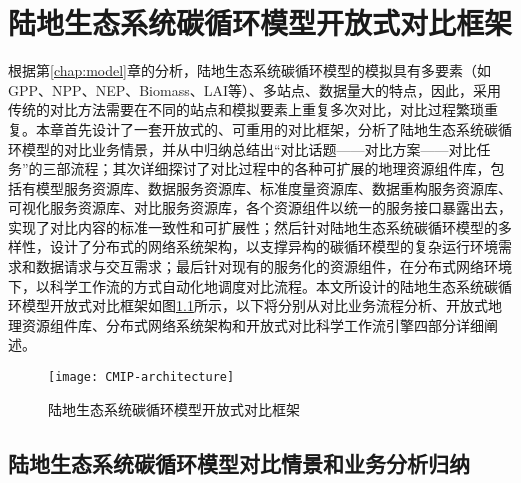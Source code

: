 \chapter{陆地生态系统碳循环模型开放式对比框架}

根据第\ref{chap:model}章的分析，陆地生态系统碳循环模型的模拟具有多要素（如GPP、NPP、NEP、Biomass、LAI等）、多站点、数据量大的特点，因此，采用传统的对比方法需要在不同的站点和模拟要素上重复多次对比，对比过程繁琐重复。本章首先设计了一套开放式的、可重用的对比框架，分析了陆地生态系统碳循环模型的对比业务情景，并从中归纳总结出“对比话题——对比方案——对比任务”的三部流程；其次详细探讨了对比过程中的各种可扩展的地理资源组件库，包括有模型服务资源库、数据服务资源库、标准度量资源库、数据重构服务资源库、可视化服务资源库、对比服务资源库，各个资源组件以统一的服务接口暴露出去，实现了对比内容的标准一致性和可扩展性；然后针对陆地生态系统碳循环模型的多样性，设计了分布式的网络系统架构，以支撑异构的碳循环模型的复杂运行环境需求和数据请求与交互需求；最后针对现有的服务化的资源组件，在分布式网络环境下，以科学工作流的方式自动化地调度对比流程。本文所设计的陆地生态系统碳循环模型开放式对比框架如图\ref{fig:CMIP-architecture}所示，以下将分别从对比业务流程分析、开放式地理资源组件库、分布式网络系统架构和开放式对比科学工作流引擎四部分详细阐述。

\begin{figure}[!htbp]
    \centering
    \texttt{[image: CMIP-architecture]}
    \caption{陆地生态系统碳循环模型开放式对比框架}
    \label{fig:CMIP-architecture}
\end{figure}

\section{陆地生态系统碳循环模型对比情景和业务分析归纳}
\label{sec:scene}
